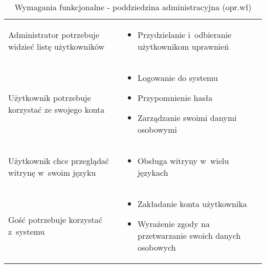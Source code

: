 \begin{minipage}{\textwidth}
    \begin{table}[H]
        \centering\caption{Wymagania funkcjonalne - poddziedzina administracyjna (opr.wł)\label{tabela:wymaganiaFunkcjonalneOgolne}}
        \begin{tabular}{|P{.3\textwidth}|P{.6\textwidth}|}
            \hline
             &  \\

            \hline
            Administrator potrzebuje widzieć listę użytkowników &
            \begin{itemize}
                \item Przydzielanie i~odbieranie użytkownikom uprawnień
            \end{itemize} \\
            \hline
            Użytkownik potrzebuje korzystać ze swojego konta &
            \begin{itemize}
                \item Logowanie do systemu
                \item Przypomnienie hasła
                \item Zarządzanie swoimi danymi osobowymi
            \end{itemize} \\
            \hline
            Użytkownik chce przeglądać witrynę w~swoim języku &
            \begin{itemize}
                \item Obsługa witryny w~wielu językach
            \end{itemize} \\
            \hline
            Gość potrzebuje korzystać z~systemu &
            \begin{itemize}
                \item Zakładanie konta użytkownika
                \item Wyrażenie zgody na przetwarzanie swoich danych osobowych
            \end{itemize} \\
            \hline
        \end{tabular}
    \end{table}
\end{minipage}

